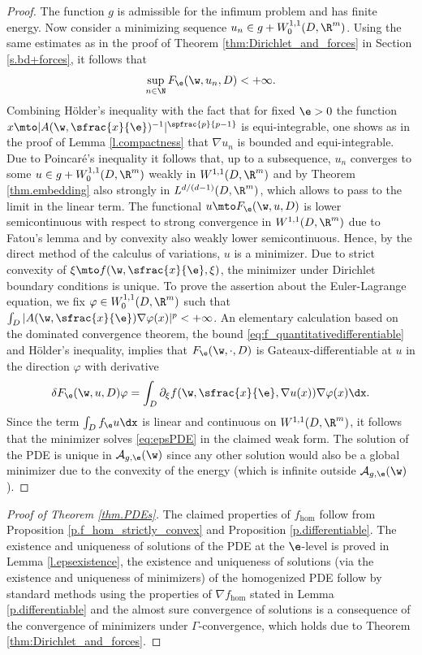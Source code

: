 \begin{proof}
The function $g$ is admissible for the infimum problem and has finite energy. Now consider a minimizing sequence $u_n\in g+W^{1,1}_0(D,\R^m)$. Using the same estimates as in the proof of Theorem \ref{thm:Dirichlet_and_forces} in Section \ref{s.bd+forces}, it follows that
\begin{equation*}
\sup_{n\in\N}F_{\e}(\w,u_n,D)<+\infty.
\end{equation*}
Combining Hölder's inequality with the fact that for fixed $\e>0$ the function $x\mto |A(\w,\sfrac{x}{\e})^{-1}|^{\spfrac{p}{p-1}}$ is equi-integrable, one shows as in the proof of Lemma \ref{l.compactness} that $\nabla u_n$ is bounded and equi-integrable. Due to Poincaré's inequality it follows that, up to a subsequence, $u_n$ converges to some $u\in g+W^{1,1}_0(D,\R^m)$ weakly in $W^{1,1}(D,\R^m)$ and by Theorem \ref{thm.embedding} also strongly in $L^{d/(d-1)}(D,\R^m)$, which allows to pass to the limit in the linear term. The functional $u\mto F_{\e}(\w,u,D)$ is lower semicontinuous with respect to strong convergence in $W^{1,1}(D,\R^m)$ due to Fatou's lemma and by convexity also weakly lower semicontinuous. Hence, by the direct method of the calculus of variations, $u$ is a minimizer. Due to strict convexity of $\xi\mto f(\w,\sfrac{x}{\e},\xi)$, the minimizer under Dirichlet boundary conditions is unique. To prove the assertion about the Euler-Lagrange equation, we fix $\varphi\in W_0^{1,1}(D,\R^m)$ such that $\int_D|A(\w,\sfrac{x}{\e})\nabla \varphi(x)|^p<+\infty$. An elementary calculation based on the dominated convergence theorem, the bound \eqref{eq:f_quantitativedifferentiable} and Hölder's inequality, implies that $F_{\e}(\w,\cdot,D)$ is Gateaux-differentiable at $u$ in the direction $\varphi$ with derivative
\begin{equation*}
\delta F_{\e}(\w,u,D)\varphi=\int_D \partial_{\xi}f(\w,\sfrac{x}{\e},\nabla u(x))\nabla\varphi(x)\dx.
\end{equation*}
Since the term $\int_D f_{\e}u\dx$ is linear and continuous on $W^{1,1}(D,\R^m)$, it follows that the minimizer solves \eqref{eq:epsPDE} in the claimed weak form. The solution of the PDE is unique in $\mathcal{A}_{g,\e}(\w)$ since any other solution would also be a global minimizer due to the convexity of the energy (which is infinite outside $\mathcal{A}_{g,\e}(\w)$).
\end{proof}

\begin{proof}[Proof of Theorem \ref{thm.PDEs}]
The claimed properties of $f_{\hom}$ follow from Proposition \ref{p.f_hom_strictly_convex} and Proposition \ref{p.differentiable}. The existence and uniqueness of solutions of the PDE at the $\e$-level is proved in Lemma \ref{l.epsexistence}, the existence and uniqueness of solutions (via the existence and uniqueness of minimizers) of the homogenized PDE follow by standard methods using the properties of $\nabla f_{\hom}$ stated in Lemma \ref{p.differentiable} and the almost sure convergence of solutions is a consequence of the convergence of minimizers under $\Gamma$-convergence, which holds due to Theorem \ref{thm:Dirichlet_and_forces}.
\end{proof}

